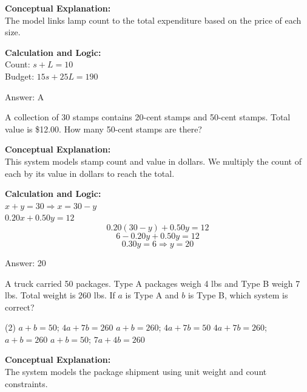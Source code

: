 \documentclass[11pt,paper=a4,answers]{exam}
\begin{document}
\begin{questions}
\begin{solution}
\textbf{Conceptual Explanation:} \\
The model links lamp count to the total expenditure based on the price of each size.

\vspace{10pt}
\textbf{Calculation and Logic:} \\
Count: $s + L = 10$ \\
Budget: $15s + 25L = 190$

\vspace{15pt}
Answer: \colorbox{yellow!100}{A}
\end{solution}

\question
A collection of 30 stamps contains 20-cent stamps and 50-cent stamps. Total value is \$12.00. How many 50-cent stamps are there?

\begin{solution}
\textbf{Conceptual Explanation:} \\
This system models stamp count and value in dollars. We multiply the count of each by its value in dollars to reach the total.

\vspace{10pt}
\textbf{Calculation and Logic:} \\
$x + y = 30 \Rightarrow x = 30 - y$ \\
$0.20x + 0.50y = 12$ \\
\[0.20(30 - y) + 0.50y = 12\]
\[6 - 0.20y + 0.50y = 12\]
\[0.30y = 6 \Rightarrow y = 20\]

\vspace{15pt}
Answer: \colorbox{yellow!100}{20}
\end{solution}

\question
A truck carried 50 packages. Type A packages weigh 4 lbs and Type B weigh 7 lbs. Total weight is 260 lbs. If $a$ is Type A and $b$ is Type B, which system is correct?
\begin{tasks}(2)
    \task $a + b = 50$; $4a + 7b = 260$
    \task $a + b = 260$; $4a + 7b = 50$
    \task $4a + 7b = 260$; $a + b = 260$
    \task $a + b = 50$; $7a + 4b = 260$
\end{tasks}

\begin{solution}
\textbf{Conceptual Explanation:} \\
The system models the package shipment using unit weight and count constraints.


\end{solution}
\end{questions}
\end{document}
